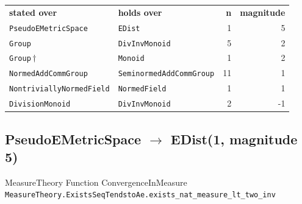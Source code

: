 \documentclass[10pt,a4paper]{article}
\begin{document}
\begin{center}
\begin{tabular}{llrr}
\textbf{stated over} & \textbf{holds over} & \textbf{n} & \textbf{magnitude}\\[2pt]
\texttt{\small PseudoEMetricSpace} & \texttt{\small EDist} & 1 & 5\\
\texttt{\small Group} & \texttt{\small DivInvMonoid} & 5 & 2\\
\texttt{\small Group}\,$\dagger$ & \texttt{\small Monoid} & 1 & 2\\
\texttt{\small NormedAddCommGroup} & \texttt{\small SeminormedAddCommGroup} & 11 & 1\\
\texttt{\small NontriviallyNormedField} & \texttt{\small NormedField} & 1 & 1\\
\texttt{\small DivisionMonoid} & \texttt{\small DivInvMonoid} & 2 & -1\\
\end{tabular}
\end{center}

\subsection*{PseudoEMetricSpace $\to$ EDist\quad\textmd{\small (1, magnitude 5)}}
{\footnotesize\color{locator}MeasureTheory\,\textperiodcentered\,Function\,\textperiodcentered\,ConvergenceInMeasure}\\
\hspace*{1em}\texttt{\small MeasureTheory.\allowbreak{}ExistsSeqTendstoAe.\allowbreak{}exists\_nat\_measure\_lt\_two\_inv}\\
\end{document}
